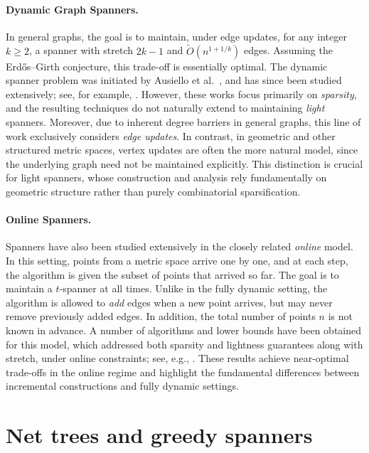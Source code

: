\documentclass[11pt]{article}
\def\EMPH#1{\emph{\textcolor{BrickRed} {#1}}}
\begin{document}
\paragraph*{Dynamic Graph Spanners.}
In general graphs, the goal is to maintain, under edge updates, for any integer $k \ge 2$, a spanner with stretch $2k - 1$ and $\widetilde{O}(n^{1+1/k})$ edges. Assuming the Erd\H{o}s--Girth conjecture, this trade-off is essentially optimal. The dynamic spanner problem was initiated by Ausiello et al.~\cite{ausiello2005small}, and has since been studied extensively; see, for example,
\cite{baswana2012fully, bodwin2016fully, elkin2011streaming, bernstein2021deamortization, forster2019dynamic}.
However, these works focus primarily on \EMPH{sparsity}, and the resulting techniques do not naturally extend to maintaining \EMPH{light} spanners.
Moreover, due to inherent degree barriers in general graphs, this line of work exclusively considers \emph{edge updates}.
In contrast, in geometric and other structured metric spaces, vertex updates are often the more natural model, since the underlying graph need not be maintained explicitly.
This distinction is crucial for light spanners, whose construction and analysis rely fundamentally on geometric structure rather than purely combinatorial sparsification.
%
\paragraph*{Online Spanners.}
Spanners have also been studied extensively in the closely related \emph{online} model.
In this setting, points from a metric space arrive one by one, and at each step, the algorithm is given the subset of points that arrived so far.
The goal is to maintain a $t$-spanner at all times. Unlike in the fully dynamic setting, the algorithm is allowed to \emph{add} edges when a new point arrives, but may never remove previously added edges.
In addition, the total number of points $n$ is not known in advance. A number of algorithms and lower bounds have been obtained for this model, which addressed both sparsity and lightness guarantees along with stretch, under online constraints; see, e.g.,
\cite{BhoreFKT24, BhoreT25, AlonAABN06, AlonA92, BermanC97, HajiaghayiLP17, NaorPS11}.
These results achieve near-optimal trade-offs in the online regime and highlight the fundamental differences between incremental constructions and fully dynamic settings. 
%
%
%
\section{Net trees and greedy spanners}\label{sec:NetTreesGreedySpanner}
\end{document}
